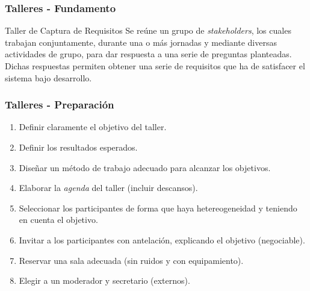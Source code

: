 ﻿\documentclass[handout,a4paper,slidestop,xcolor=pst,dvips,blue]{beamer}
\begin{document}
\begin{frame}[t]
    \frametitle{Talleres - Fundamento}
    \begin{block}{Taller de Captura de Requisitos}
        Se reúne un grupo de \emph{stakeholders}, los cuales trabajan conjuntamente, durante una o más jornadas y mediante diversas actividades de grupo, para dar respuesta a una serie de preguntas planteadas. Dichas respuestas permiten obtener una serie de requisitos que ha de satisfacer el sistema bajo desarrollo.
    \end{block}
\end{frame}

\begin{frame}[c]
    \frametitle{Talleres - Preparación}
    \begin{enumerate}[<+->]
        \item Definir claramente el objetivo del taller.
        \item Definir los resultados esperados.
        \item Diseñar un método de trabajo adecuado para alcanzar los objetivos.
        \item Elaborar la \alert{\emph{agenda}} del taller (incluir descansos).
        \item Seleccionar los participantes de forma que haya hetereogeneidad y teniendo en cuenta el objetivo.
        \item Invitar a los participantes con antelación, explicando el objetivo (negociable).
        \item Reservar una sala adecuada (sin ruidos y con equipamiento).
        \item Elegir a un moderador y secretario (externos).
    \end{enumerate}
\end{frame}
\end{document}
